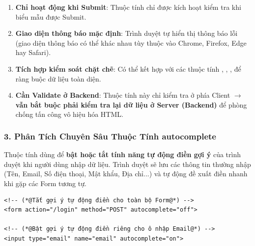 \begin{warnBox}
\begin{enumerate}[leftmargin=1.5em, itemsep=4pt, parsep=0pt]
    \item \textbf{Chỉ hoạt động khi Submit}: Thuộc tính  chỉ được kích hoạt kiểm tra khi biểu mẫu được Submit.
    \item \textbf{Giao diện thông báo mặc định}: Trình duyệt tự hiển thị thông báo lỗi (giao diện thông báo có thể khác nhau tùy thuộc vào Chrome, Firefox, Edge hay Safari).
    \item \textbf{Tích hợp kiểm soát chặt chẽ}: Có thể kết hợp  với các thuộc tính , , ,  để ràng buộc dữ liệu toàn diện.
    \item \textbf{Cần Validate ở Backend}: Thuộc tính này chỉ kiểm tra ở phía Client $\rightarrow$ \textbf{vẫn bắt buộc phải kiểm tra lại dữ liệu ở Server (Backend)} để phòng chống tấn công vô hiệu hóa HTML.
\end{enumerate}
\end{warnBox}

\subsubsection{3. Phân Tích Chuyên Sâu Thuộc Tính autocomplete}

\begin{conceptBox}
Thuộc tính  dùng để \textbf{bật hoặc tắt tính năng tự động điền gợi ý} của trình duyệt khi người dùng nhập dữ liệu. Trình duyệt sẽ lưu các thông tin thường nhập (Tên, Email, Số điện thoại, Mật khẩu, Địa chỉ...) và tự động đề xuất điền nhanh khi gặp các Form tương tự.
\end{conceptBox}

\begin{codeWindow}
\begin{lstlisting}[language=HTML5]
<!-- (*@Tắt gợi ý tự động điền cho toàn bộ Form@*) -->
<form action="/login" method="POST" autocomplete="off">

<!-- (*@Bật gợi ý tự động điền riêng cho ô nhập Email@*) -->
<input type="email" name="email" autocomplete="on">
\end{lstlisting}
\end{codeWindow}

